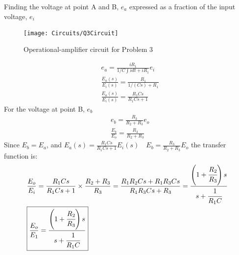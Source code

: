 \documentclass[12pt]{article}
\newenvironment{problem}[2][Problem]{\begin{trivlist}
		\item[\hskip \labelsep {\bfseries #1}\hskip \labelsep {\bfseries #2.}]}{\end{trivlist}}
\begin{document}
\begin{problem}{3 ---  (B)-3-11 --- obtain transfer function} \hfill\newline
Finding the voltage at point A and B, $e_a$ expressed as a fraction of the input voltage, $e_i$
\begin{figure}
	\centering
	\texttt{[image: Circuits/Q3Circuit]}
	\caption{Operational-amplifier circuit for Problem 3}
	\label{fig:q3circuit}
\end{figure}
\end{problem}
\begin{align*}
& e_a = \frac{iR_1}{1/C \int i d t + iR_1}e_i \\
& \frac{E_a(s)}{E_i(s)} =\frac{R_1}{1 / (Cs) + R_1} \\
& \frac{E_a(s)}{E_i(s)} =\frac{R_1Cs}{R_1Cs+1}
\end{align*}
For the voltage at point B, $e_b$
\begin{align*}
& e_b =\frac{R_3}{R_2+R_3}e_o \\
& \frac{E_b}{E_o} = \frac{R_3}{R_2+R_3}
\end{align*}
Since $E_b= E_a$, and $\displaystyle E_a(s) =\frac{R_1Cs}{R_1Cs+1}E_i(s) \quad  E_b =\frac{R_3}{R_2+R_3}E_o$ the transfer function is:
\begin{align*}
& \frac{E_o}{E_i}=\frac{R_1Cs}{R_1Cs+1}\times \frac{R_2+R_3}{R_3}= \frac{R_1R_2Cs+R_1R_3Cs}{R_1R_3Cs + R_3} = \frac{\left(1+\cfrac{R_2}{R_3}\right)s}{s+\cfrac{1}{R_1C}} \\
& \boxed{\frac{E_o}{E_1} = \frac{\left(1+\cfrac{R_2}{R_3}\right)s}{s+\cfrac{1}{R_1C}}}
\end{align*}
\end{document}
